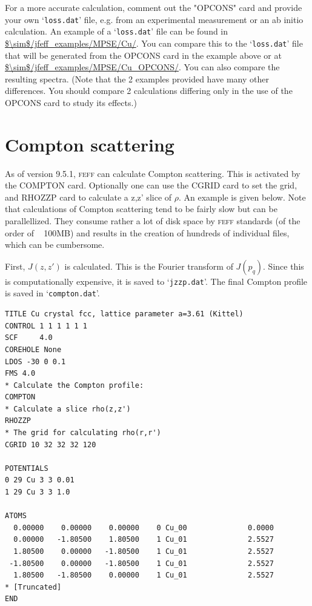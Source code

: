 \documentclass[11pt,oneside]{report} %
\renewcommand{\htmlref}[2]{\hyperlink{#2}{#1}}
\newcommand{\program}[1]{\textsc{#1}}
\newcommand{\feff}{\program{feff}}
\newcommand{\file}[1]{`\texttt{#1}'}
\renewcommand{\htmlref}[2]{{#1}} %
\begin{document}
For a more accurate calculation, comment out the "OPCONS" card and provide your own \file{loss.dat} file, e.g. from an experimental measurement or 
an ab initio calculation.  An example of a \file{loss.dat} file can be found in \url{$\sim$/jfeff_examples/MPSE/Cu/}.  You can compare this to the
\file{loss.dat} file that will be generated from the OPCONS card in the example above or at \url{$\sim$/jfeff_examples/MPSE/Cu\_OPCONS/}.  You can also compare the resulting spectra.  (Note that the 2 examples provided have many other differences.  You should compare 2 calculations differing only in the use of the OPCONS card to study its effects.)


\section{Compton scattering}
\label{Sec:Compton}
As of version 9.5.1, {\feff} can calculate Compton scattering.  This is activated by the \htmlref{COMPTON}{card:com} card.  Optionally one can use the \htmlref{CGRID}{card:cgr} card to set the grid, and \htmlref{RHOZZP} {card:rho} card to calculate a z,z' slice of $\rho$.  An example is given below.  Note that calculations of Compton scattering tend to be fairly slow but can be parallellized.  They consume rather a lot of disk space by {\feff} standards (of the order of ~ 100MB) and results in the creation of hundreds of individual files, which can be cumbersome.
 
  First, $J(z,z')$ is calculated.  This is the Fourier transform of $J(p_q)$.   Since this is computationally expensive, it is saved to \file{jzzp.dat}.  The final Compton profile is saved in \file{compton.dat}.

\begin{verbatim}
TITLE Cu crystal fcc, lattice parameter a=3.61 (Kittel)
CONTROL 1 1 1 1 1 1  
SCF     4.0
COREHOLE None
LDOS -30 0 0.1
FMS 4.0
* Calculate the Compton profile:
COMPTON
* Calculate a slice rho(z,z')
RHOZZP
* The grid for calculating rho(r,r')
CGRID 10 32 32 32 120 

POTENTIALS
0 29 Cu 3 3 0.01 
1 29 Cu 3 3 1.0 

ATOMS
  0.00000    0.00000    0.00000    0 Cu_00              0.0000
  0.00000   -1.80500    1.80500    1 Cu_01              2.5527
  1.80500    0.00000   -1.80500    1 Cu_01              2.5527
 -1.80500    0.00000   -1.80500    1 Cu_01              2.5527
  1.80500   -1.80500    0.00000    1 Cu_01              2.5527
* [Truncated]
END
\end{verbatim}
\end{document}
